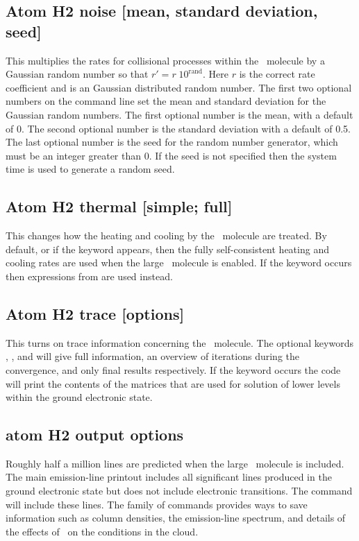 \subsection{Atom H2 noise [mean, standard deviation, seed]}

This multiplies the rates for collisional processes within the \htwo\ molecule
by a Gaussian random number so that $r' = r\;10^{{\mathrm{rand}}} $.
Here $r$
is the correct rate coefficient and  is an Gaussian
distributed random number.  The first two optional numbers on the command
line set the mean and standard deviation for the Gaussian random numbers.
The first optional number is the mean, with a default of 0.  The second
optional number is the standard deviation with a default of 0.5.  The last
optional number is the seed for the random number generator, which must
be an integer greater than 0.
If the seed is not specified then the system
time is used to generate a random seed.

\subsection{Atom H2 thermal [simple; full]}

This changes how the heating and cooling by the \htwo\ molecule
are treated.
By default, or if the keyword  appears,
then the fully self-consistent
heating and cooling rates are used when the large \htwo\ molecule
is enabled.
If the keyword  occurs then expressions
from \citet{Tielens1985a} are used instead.

\subsection{Atom H2 trace [options]}

This turns on trace information concerning the \htwo\ molecule.
The optional
keywords , ,
and  will give full information, an overview
of iterations during the convergence, and only final results respectively.
If the keyword  occurs the code will print
the contents of the matrices
that are used for solution of lower levels within the ground electronic
state.

\subsection{atom H2 output options}

Roughly half a million lines are predicted when the large
\htwo\ molecule is included.
The main emission-line printout includes all significant lines
produced in the ground electronic state but does not include electronic
transitions.
The  command
will include these lines.
The family of  commands
provides ways to save information such as column densities,
the emission-line spectrum, and details of the effects of \htwo\ on the
conditions in the cloud.

